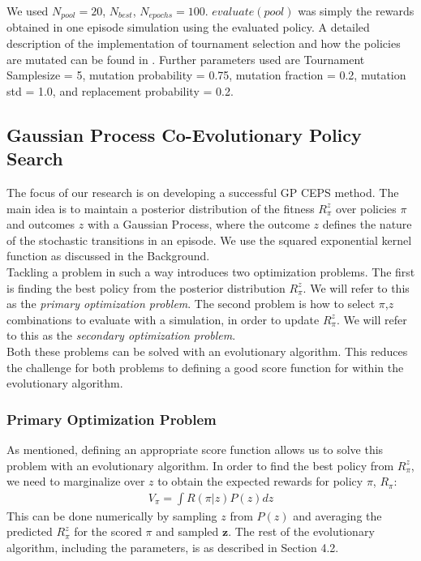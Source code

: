 We used $N_{pool} = 20$, $N_{best}$, $N_{epochs} = 100$. $evaluate(pool)$ was simply the rewards obtained in one episode simulation using the evaluated policy.  
A detailed description of the implementation of tournament selection and how the policies are mutated can be found in \cite{koppejan2011neuroevolutionary}. Further parameters used are Tournament Samplesize = 5, mutation probability = 0.75, mutation fraction = 0.2, mutation std = 1.0, and replacement probability = 0.2. 

\subsection{Gaussian Process Co-Evolutionary Policy Search}

The focus of our research is on developing a successful GP CEPS method. The main idea is to maintain a posterior distribution of the fitness $R_{\pi}^z$ over policies $\pi$ and outcomes $z$ with a Gaussian Process, where the outcome $z$ defines the nature of the stochastic transitions in an episode. We use the squared exponential kernel function as discussed in the Background. \\
Tackling a problem in such a way introduces two optimization problems. The first is finding the best policy from the posterior distribution $R_{\pi}^z$. We will refer to this as the \textit{primary optimization problem}. The second problem is how to select $\pi$,$z$ combinations to evaluate with a simulation, in order to update $R_{\pi}^z$. We will refer to this as the \textit{secondary optimization problem}. \\
Both these problems can be solved with an evolutionary algorithm. This reduces the challenge for both problems to defining a good score function for within the evolutionary algorithm.

\subsubsection{Primary Optimization Problem}

As mentioned, defining an appropriate score function allows us to solve this problem with an evolutionary algorithm. In order to find the best policy from $R_{\pi}^z$, we need to marginalize over $z$ to obtain the expected rewards for policy $\pi$, $R_{\pi}$: 
\begin{align}
V_{\pi} = \int R(\pi | z) P(z)dz 
\end{align}
This can be done numerically by sampling $z$ from $P(z)$ and averaging the predicted $R_{\pi}^z$ for the scored $\pi$ and sampled $\mathbf{z}$. The rest of the evolutionary algorithm, including the parameters, is as described in Section 4.2.

